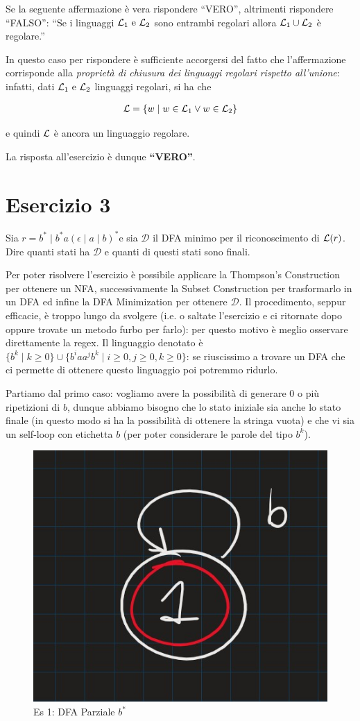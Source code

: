 \documentclass[class=book, crop=false, oneside, 12pt]{standalone}
\begin{document}
Se la seguente affermazione è vera rispondere “VERO”, altrimenti rispondere “FALSO”: “Se i linguaggi \(\mathcal{L}_1 \textrm{ e } \mathcal{L}_2\) sono entrambi regolari allora \(\mathcal{L}_1 \cup \mathcal{L}_2\) è regolare.”

In questo caso per rispondere è sufficiente accorgersi del fatto che l'affermazione corrisponde alla \emph{proprietà di chiusura dei linguaggi regolari rispetto all'unione}: infatti, dati \(\mathcal{L}_1 \textrm{ e } \mathcal{L}_2\) linguaggi regolari, si ha che 

\begin{align*}
    \mathcal{L} = \{w \mid w \in \mathcal{L}_1 \lor w \in \mathcal{L}_2\}
\end{align*}

e quindi \(\mathcal{L}\) è ancora un linguaggio regolare. 

La risposta all'esercizio è dunque \textbf{“VERO”}.

\section*{Esercizio 3}

Sia \(r=b^* \mid b^* a (\epsilon \mid a \mid b)^*\)e sia \(\mathcal{D}\) il DFA minimo per il riconoscimento di \(\mathcal{L}(r)\). Dire quanti stati ha \(\mathcal{D}\) e quanti di questi stati sono finali.

Per poter risolvere l'esercizio è possibile applicare la Thompson's Construction per ottenere un NFA, successivamente la Subset Construction per trasformarlo in un DFA ed infine la DFA Minimization per ottenere \(\mathcal{D}\). Il procedimento, seppur efficacie, è troppo lungo da svolgere (i.e. o saltate l'esercizio e ci ritornate dopo oppure trovate un metodo furbo per farlo): per questo motivo è meglio osservare direttamente la regex. Il linguaggio denotato è \(\{b^k \mid k \geq 0\} \cup \{b^i a a^j b^k \mid i \geq 0, j \geq 0, k \geq 0\}\): se riuscissimo a trovare un DFA che ci permette di ottenere questo linguaggio poi potremmo ridurlo. 

Partiamo dal primo caso: vogliamo avere la possibilità di generare 0 o più ripetizioni di \(b\), dunque abbiamo bisogno che lo stato iniziale sia anche lo stato finale (in questo modo si ha la possibilità di ottenere la stringa vuota) e che vi sia un self-loop con etichetta \(b\) (per poter considerare le parole del tipo \(b^k\)).

\begin{figure}[H]
	\centering
    \includegraphics[width=.3\textwidth]{dfa-pt1-ex3.jpg}
    \caption{Es 1: DFA Parziale \(b^*\)}
    \label{fig:dfa-pt1-ex3}
\end{figure}
\end{document}
